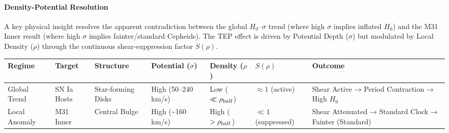 \documentclass[
]{article}
\newcounter{none} %
\begin{document}
\paragraph{Density-Potential
Resolution}\label{density-potential-resolution}

A key physical insight resolves the apparent contradiction between the
global \(H_0\)--\(\sigma\) trend (where high \(\sigma\) implies inflated
\(H_0\)) and the M31 Inner result (where high \(\sigma\) implies
fainter/standard Cepheids). The TEP effect is driven by Potential Depth
(\(\sigma\)) but modulated by Local Density (\(\rho\)) through the
continuous shear-suppression factor \(S(\rho)\).

{\def\LTcaptype{none} %
\begin{longtable}[]{@{}
  >{\raggedright\arraybackslash}p{}
  >{\raggedright\arraybackslash}p{}
  >{\raggedright\arraybackslash}p{}
  >{\raggedright\arraybackslash}p{}
  >{\raggedright\arraybackslash}p{}
  >{\raggedright\arraybackslash}p{}
  >{\raggedright\arraybackslash}p{}@{}}
\toprule\noalign{}
\begin{minipage}[b]{\linewidth}\raggedright
Regime
\end{minipage} & \begin{minipage}[b]{\linewidth}\raggedright
Target
\end{minipage} & \begin{minipage}[b]{\linewidth}\raggedright
Structure
\end{minipage} & \begin{minipage}[b]{\linewidth}\raggedright
Potential (\(\sigma\))
\end{minipage} & \begin{minipage}[b]{\linewidth}\raggedright
Density (\(\rho\))
\end{minipage} & \begin{minipage}[b]{\linewidth}\raggedright
\(S(\rho)\)
\end{minipage} & \begin{minipage}[b]{\linewidth}\raggedright
Outcome
\end{minipage} \\
\midrule\noalign{}
\endhead
\bottomrule\noalign{}
\endlastfoot
Global Trend & SN Ia Hosts & Star-forming Disks & High (50--240 km/s) &
Low (\(\ll \rho_{\rm half}\)) & \(\approx 1\) (active) & Shear Active →
Period Contraction → High \(H_0\) \\
Local Anomaly & M31 Inner & Central Bulge & High (\textasciitilde160
km/s) & High (\(> \rho_{\rm half}\)) & \(\ll 1\) (suppressed) & Shear
Attenuated → Standard Clock → Fainter (Standard) \\
\end{longtable}
}
\end{document}
